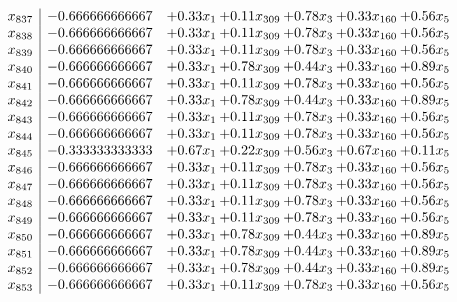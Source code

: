 \documentclass[8pt]{article}
\begin{document}
\[\begin{array}{c| c c@{\hskip 2pt} c@{\hskip 2pt} c@{\hskip 2pt} c@{\hskip 2pt} c@{\hskip 2pt} }
 x_{837}   &  -0.666666666667 & +  0.33 x_{1} & +  0.11 x_{309} & +  0.78 x_{3} & +  0.33 x_{160} & +  0.56 x_{5}\\
 x_{838}   &  -0.666666666667 & +  0.33 x_{1} & +  0.11 x_{309} & +  0.78 x_{3} & +  0.33 x_{160} & +  0.56 x_{5}\\
 x_{839}   &  -0.666666666667 & +  0.33 x_{1} & +  0.11 x_{309} & +  0.78 x_{3} & +  0.33 x_{160} & +  0.56 x_{5}\\
 x_{840}   &  -0.666666666667 & +  0.33 x_{1} & +  0.78 x_{309} & +  0.44 x_{3} & +  0.33 x_{160} & +  0.89 x_{5}\\
 x_{841}   &  -0.666666666667 & +  0.33 x_{1} & +  0.11 x_{309} & +  0.78 x_{3} & +  0.33 x_{160} & +  0.56 x_{5}\\
 x_{842}   &  -0.666666666667 & +  0.33 x_{1} & +  0.78 x_{309} & +  0.44 x_{3} & +  0.33 x_{160} & +  0.89 x_{5}\\
 x_{843}   &  -0.666666666667 & +  0.33 x_{1} & +  0.11 x_{309} & +  0.78 x_{3} & +  0.33 x_{160} & +  0.56 x_{5}\\
 x_{844}   &  -0.666666666667 & +  0.33 x_{1} & +  0.11 x_{309} & +  0.78 x_{3} & +  0.33 x_{160} & +  0.56 x_{5}\\
 x_{845}   &  -0.333333333333 & +  0.67 x_{1} & +  0.22 x_{309} & +  0.56 x_{3} & +  0.67 x_{160} & +  0.11 x_{5}\\
 x_{846}   &  -0.666666666667 & +  0.33 x_{1} & +  0.11 x_{309} & +  0.78 x_{3} & +  0.33 x_{160} & +  0.56 x_{5}\\
 x_{847}   &  -0.666666666667 & +  0.33 x_{1} & +  0.11 x_{309} & +  0.78 x_{3} & +  0.33 x_{160} & +  0.56 x_{5}\\
 x_{848}   &  -0.666666666667 & +  0.33 x_{1} & +  0.11 x_{309} & +  0.78 x_{3} & +  0.33 x_{160} & +  0.56 x_{5}\\
 x_{849}   &  -0.666666666667 & +  0.33 x_{1} & +  0.11 x_{309} & +  0.78 x_{3} & +  0.33 x_{160} & +  0.56 x_{5}\\
 x_{850}   &  -0.666666666667 & +  0.33 x_{1} & +  0.78 x_{309} & +  0.44 x_{3} & +  0.33 x_{160} & +  0.89 x_{5}\\
 x_{851}   &  -0.666666666667 & +  0.33 x_{1} & +  0.78 x_{309} & +  0.44 x_{3} & +  0.33 x_{160} & +  0.89 x_{5}\\
 x_{852}   &  -0.666666666667 & +  0.33 x_{1} & +  0.78 x_{309} & +  0.44 x_{3} & +  0.33 x_{160} & +  0.89 x_{5}\\
 x_{853}   &  -0.666666666667 & +  0.33 x_{1} & +  0.11 x_{309} & +  0.78 x_{3} & +  0.33 x_{160} & +  0.56 x_{5}\\

\end{array}\]
\end{document}
